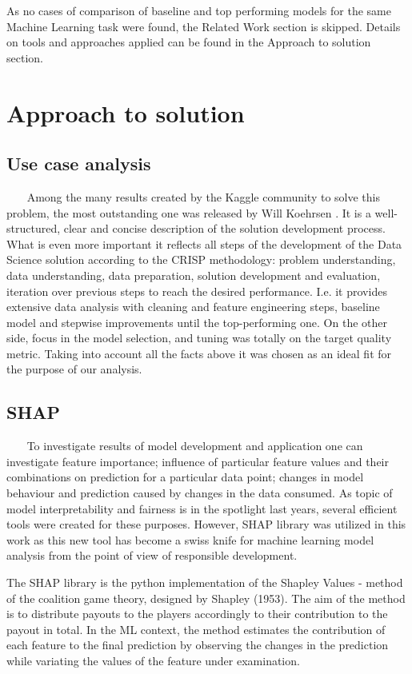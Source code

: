    As no cases of comparison of baseline and top performing models for the same Machine Learning task were found, the Related Work section is skipped. Details on tools and approaches applied can be found in the Approach to solution section.
    
\section{Approach to solution}
\subsection{Use case analysis}~~~
    Among the many results created by the Kaggle community to solve this problem, the most outstanding one was released by Will Koehrsen \cite{kaggle_2}. It is a well-structured, clear and concise description of the solution development process. What is even more important it reflects all steps of the development of the Data Science solution according to the CRISP methodology: problem understanding, data understanding, data preparation, solution development and evaluation, iteration over previous steps to reach the desired performance. I.e. it provides extensive data analysis with cleaning and feature engineering steps, baseline model and stepwise improvements until the top-performing one. On the other side, focus in the model selection, and tuning was totally on the target quality metric. Taking into account all the facts above it was chosen as an ideal fit for the purpose of our analysis.
    
\subsection{SHAP}~~~
    To investigate results of model development and application one can investigate feature importance; influence of particular feature values and their combinations on prediction for a particular data point; changes in model behaviour and prediction caused by changes in the data consumed. As topic of model interpretability and fairness is in the spotlight last years, several efficient tools were created for these purposes. However, SHAP \cite{NIPS2017_7062} library was utilized in this work as this new tool has become a swiss knife for machine learning model analysis from the point of view of responsible development.

    The SHAP library is the python implementation of the Shapley Values - method of the coalition game theory, designed by Shapley (1953). The aim of the method is to distribute payouts to the players accordingly to their contribution to the payout in total. In the ML context, the method estimates the contribution of each feature to the final prediction by observing the changes in the prediction while variating the values of the feature under examination.

